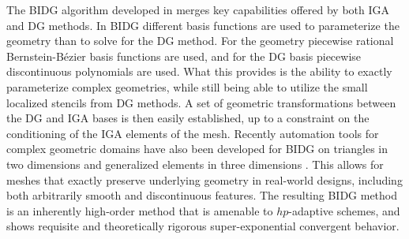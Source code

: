 The BIDG algorithm developed in \cite{Michoski2016658} merges key capabilities
offered by both IGA and DG methods.  In BIDG different basis functions are used to parameterize the geometry than to solve for the DG method.  For the geometry piecewise rational Bernstein-B\'{e}zier basis functions are used, and for the DG basis piecewise discontinuous polynomials are used.  What this provides is the ability to exactly parameterize complex geometries, while still being able to utilize the small localized stencils from DG methods.   A set of geometric transformations between the DG and IGA bases is then easily established, up to a constraint on the conditioning of the IGA elements of the mesh. 
Recently automation tools for complex geometric domains have also been developed for BIDG on triangles in two dimensions \cite{Engvall2016378} and generalized elements in three dimensions \cite{EngvallPress}.  This allows for meshes that exactly
preserve underlying geometry in real-world designs, including both arbitrarily
smooth and discontinuous features. The resulting BIDG method is an inherently high-order method that is amenable to $hp$-adaptive schemes, and shows requisite and theoretically rigorous super-exponential convergent behavior.





